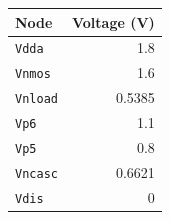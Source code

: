 \begin{tabular}{lr}
\toprule
Node & Voltage (V) \\
\midrule
\texttt{Vdda} & 1.8 \\
\texttt{Vnmos} & 1.6 \\
\texttt{Vnload} & 0.5385 \\
\texttt{Vp6} & 1.1 \\
\texttt{Vp5} & 0.8 \\
\texttt{Vncasc} & 0.6621 \\
\texttt{Vdis} & 0 \\
\bottomrule
\end{tabular}
